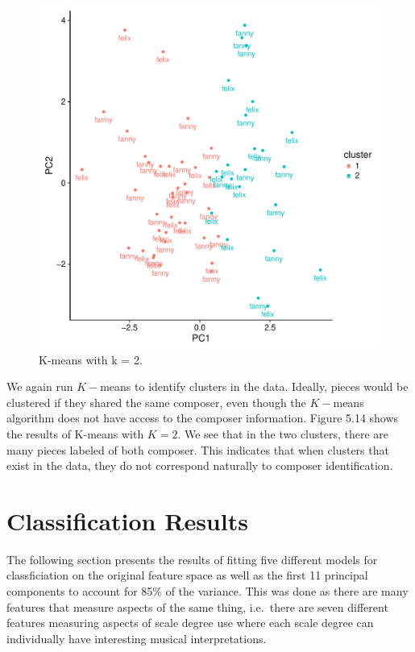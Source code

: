 \documentclass[12pt,twoside]{reedthesis}
\theoremstyle{definition}
\theoremstyle{definition}
\theoremstyle{definition}
\theoremstyle{remark}
\begin{document}
\begin{figure}[H]
\centering
\includegraphics[scale = .7]{images/kmeans_2_f.pdf}
\caption{K-means with k = 2.}
\label{subd}
\end{figure}
We again run \(K-\)means to identify clusters in the data. Ideally,
pieces would be clustered if they shared the same composer, even though
the \(K-\)means algorithm does not have access to the composer
information. Figure 5.14 shows the results of K-means with \(K = 2\). We
see that in the two clusters, there are many pieces labeled of both
composer. This indicates that when clusters that exist in the data, they
do not correspond naturally to composer identification.

\chapter{Classification Results}\label{classification-results}

The following section presents the results of fitting five different
models for classficiation on the original feature space as well as the
first 11 principal components to account for 85\% of the variance. This
was done as there are many features that measure aspects of the same
thing, i.e.~there are seven different features measuring aspects of
scale degree use where each scale degree can individually have
interesting musical interpretations.
\end{document}
